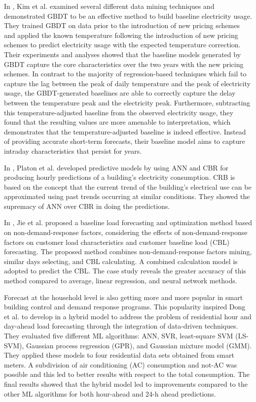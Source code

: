In \cite{7463810}, Kim et al. examined several different data mining techniques and demonstrated GBDT to be an effective method to build baseline electricity usage.
They trained GBDT on data prior to the introduction of new pricing schemes and applied the known temperature following the introduction of new pricing schemes to predict electricity usage with the expected temperature correction.
Their experiments and analyses showed that the baseline models generated by GBDT capture the core characteristics over the two years with the new pricing schemes.
In contrast to the majority of regression-based techniques which fail to capture the lag between the peak of daily temperature and the peak of electricity usage, the GBDT-generated baselines are able to correctly capture the delay between the temperature peak and the electricity peak.
Furthermore, subtracting this temperature-adjusted baseline from the observed electricity usage, they found that the resulting values are more amenable to interpretation, which demonstrates that the temperature-adjusted baseline is indeed effective.
Instead of providing accurate short-term forecasts, their baseline model aims to capture intraday characteristics that persist for years.

In \cite{PLATON201510}, Platon et al. developed predictive models by using ANN and CBR for producing hourly predictions of a building’s electricity consumption.
CRB is based on the concept that the current trend of the building's electrical use can be approximated using past trends occurring at similar conditions.
They showed the supremacy of ANN over CBR in doing the predictions.

In \cite{7576207}, Jie et al. proposed a baseline load forecasting and optimization method based on non-demand-response factors, considering the effects of non-demand-response factors on customer load characteristics and customer baseline load (CBL) forecasting.
The proposed method combines non-demand-response factors mining, similar days selecting, and CBL calculating.
A combined calculation model is adopted to predict the CBL.
The case study reveals the greater accuracy of this method compared to average, linear regression, and neural network methods.

Forecast at the household level is also getting more and more popular in smart building control and demand response programs.
This popularity inspired Dong et al. to develop in \cite{DONG2016341} a hybrid model to address the problem of residential hour and day-ahead load forecasting through the integration of data-driven techniques.
They evaluated five different ML algorithms: ANN, SVR, least-square SVM (LS-SVM), Gaussian process regression (GPR), and Gaussian mixture model (GMM).
They applied these models to four residential data sets obtained from smart meters.
A subdivision of air conditioning (AC) consumption and not-AC was possible and this led to better results with respect to the total consumption.
The final results showed that the hybrid model led to improvements compared to the other ML algorithms for both hour-ahead and 24-h ahead predictions.

